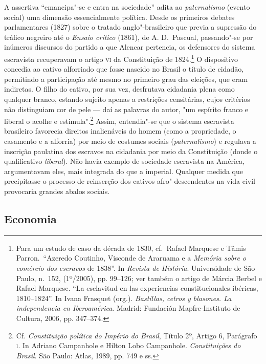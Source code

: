 A assertiva ``emancipa"-se e entra na sociedade'' adita ao \textit{paternalismo}
(evento social) uma dimensão essencialmente política. Desde os primeiros debates parlamentares (1827) sobre
o tratado anglo"-brasileiro que previa a supressão do tráfico
negreiro até o \textit{Ensaio crítico} (1861), de A. D.~Pascual,
passando"-se por inúmeros discursos do partido a que Alencar pertencia, os
defensores do sistema escravista recuperavam o artigo \textsc{vi} da
Constituição de 1824.\footnote{ Para um estudo de caso da década de
1830, cf.~Rafael Marquese e Tâmis Parron.~``Azeredo Coutinho, Visconde
de Araruama e a \textit{Memória sobre o comércio dos escravos} de
1838''. In \textit{Revista de História}. Universidade de São Paulo, n.~152, (1º/2005), pp. 99--126; ver também
o artigo de Márcia Berbel e Rafael Marquese. “La esclavitud en las experiencias constitucionales ibéricas, 1810--1824”. In Ivana Frasquet (org.). \textit{Bastillas, cetros y blasones. La independencia en Iberoamérica}. Madrid: Fundación Mapfre-Instituto de Cultura, 2006, pp. 347--374.} O dispositivo concedia ao cativo
alforriado que fosse nascido no Brasil o título de cidadão, permitindo
a participação até mesmo no primeiro grau das eleições, que eram
indiretas. O filho do cativo, por sua vez, desfrutava cidadania plena
como qualquer branco, estando sujeito apenas a restrições censitárias,
cujos critérios não distinguiam cor de pele --- daí as palavras do autor, 
"um espírito franco e liberal o acolhe e estimula".\footnote{ Cf. \textit{Constituição política do Império do Brasil}, 
Título 2º, Artigo 6, Parágrafo \textsc{i}. In Adriano Campanhole e Hilton Lobo Campanhole. 
\textit{Constituições do Brasil}. São Paulo: Atlas, 1989, pp. 749 e ss.} 
Assim, entendia"-se que o sistema escravista brasileiro favorecia
direitos inalienáveis do homem (como a propriedade, o casamento e a alforria) por 
meio de costumes sociais (\textit{paternalismo}) e regulava a inscrição paulatina
dos escravos na cidadania por meio da Constituição (donde o qualificativo \textit{liberal}). Não havia
exemplo de sociedade escravista na América, argumentavam eles, mais
integrada do que a imperial. Qualquer medida que precipitasse o
processo de reinserção dos cativos afro"-descendentes na vida civil provocaria grandes abalos sociais. 

\subsection{Economia}

